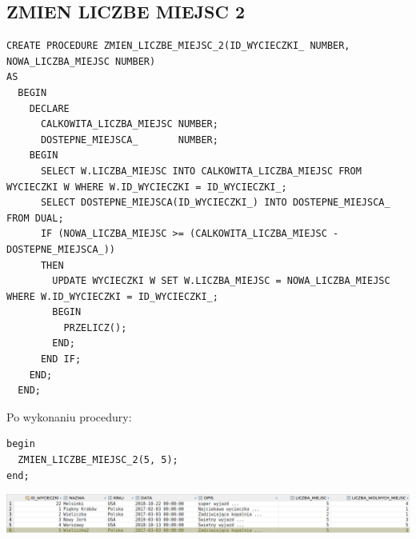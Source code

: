 \subsection{ZMIEN LICZBE MIEJSC 2}
\begin{verbatim}
CREATE PROCEDURE ZMIEN_LICZBE_MIEJSC_2(ID_WYCIECZKI_ NUMBER, NOWA_LICZBA_MIEJSC NUMBER)
AS
  BEGIN
    DECLARE
      CALKOWITA_LICZBA_MIEJSC NUMBER;
      DOSTEPNE_MIEJSCA_       NUMBER;
    BEGIN
      SELECT W.LICZBA_MIEJSC INTO CALKOWITA_LICZBA_MIEJSC FROM WYCIECZKI W WHERE W.ID_WYCIECZKI = ID_WYCIECZKI_;
      SELECT DOSTEPNE_MIEJSCA(ID_WYCIECZKI_) INTO DOSTEPNE_MIEJSCA_ FROM DUAL;
      IF (NOWA_LICZBA_MIEJSC >= (CALKOWITA_LICZBA_MIEJSC - DOSTEPNE_MIEJSCA_))
      THEN
        UPDATE WYCIECZKI W SET W.LICZBA_MIEJSC = NOWA_LICZBA_MIEJSC WHERE W.ID_WYCIECZKI = ID_WYCIECZKI_;
        BEGIN
          PRZELICZ();
        END;
      END IF;
    END;
  END;
\end{verbatim}

Po wykonaniu procedury:
\begin{verbatim}
begin
  ZMIEN_LICZBE_MIEJSC_2(5, 5);
end;
\end{verbatim}
\includegraphics[width=\linewidth]{./images/zmien_liczbe_miejsc_2.png}



  